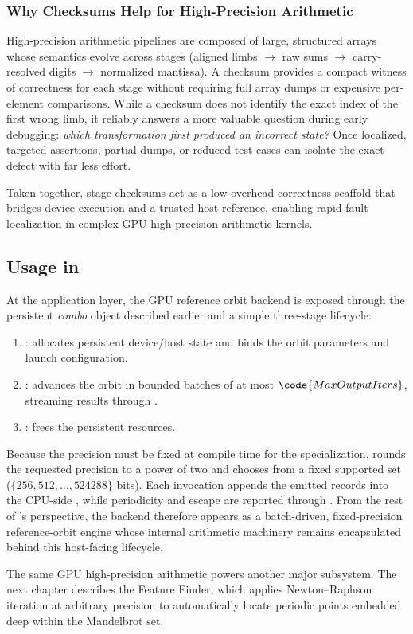 \subsubsection{Why Checksums Help for High-Precision Arithmetic}

High-precision arithmetic pipelines are composed of large, structured arrays
whose semantics evolve across stages (aligned limbs $\rightarrow$ raw sums
$\rightarrow$ carry-resolved digits $\rightarrow$ normalized mantissa). A
checksum provides a compact witness of correctness for each stage without
requiring full array dumps or expensive per-element comparisons. While a checksum
does not identify the exact index of the first wrong limb, it reliably answers a
more valuable question during early debugging: \emph{which transformation first
produced an incorrect state?} Once localized, targeted assertions, partial dumps,
or reduced test cases can isolate the exact defect with far less effort.

Taken together, stage checksums act as a low-overhead correctness scaffold that
bridges device execution and a trusted host reference, enabling rapid fault
localization in complex GPU high-precision arithmetic kernels.

\subsection{Usage in \FractalShark{}}
At the application layer, the GPU reference orbit backend is exposed through
the persistent \emph{combo} object described earlier and a simple three-stage
lifecycle:

\begin{enumerate}
  \item {}: allocates persistent device/host
        state and binds the orbit parameters and launch configuration.
  \item {}: advances the orbit in bounded
        batches of at most \(\code{MaxOutputIters}\), streaming results through
        .
  \item {}: frees the persistent resources.
\end{enumerate}

Because the precision must be fixed at compile time for the  specialization,  rounds the
requested precision to a power of two and chooses from a fixed supported set
(\(\{256,512,\dots,524288\}\) bits). Each invocation appends the emitted
 records into the CPU-side , while
periodicity and escape are reported through . From the
rest of \FractalShark{}'s perspective, the backend therefore appears as a
batch-driven, fixed-precision reference-orbit engine whose internal arithmetic
machinery remains encapsulated behind this host-facing lifecycle.

The same GPU high-precision arithmetic powers another major subsystem.  The
next chapter describes the Feature Finder, which applies Newton--Raphson
iteration at arbitrary precision to automatically locate periodic points
embedded deep within the Mandelbrot set.
